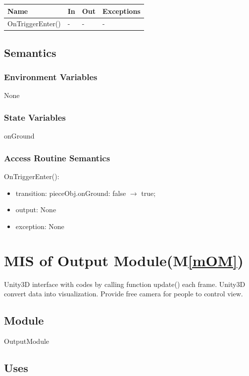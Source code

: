 \documentclass[12pt, titlepage]{article}
\newcommand{\mref}[1]{M\ref{#1}}
\begin{document}
\begin{center}
	\begin{tabular}{p{4cm} p{4cm} p{4cm} p{2cm}}
		\hline
		\textbf{Name} & \textbf{In} & \textbf{Out} & \textbf{Exceptions} \\
		\hline
		OnTriggerEnter() & - & - & - \\
		\hline
	\end{tabular}
\end{center}

\subsection{Semantics}

\subsubsection{Environment Variables}
None
\subsubsection{State Variables}

onGround

\subsubsection{Access Routine Semantics}

\noindent OnTriggerEnter():
\begin{itemize}
	\item transition: pieceObj.onGround: false $\to$ true;
	\item output: None 
	\item exception: None 
\end{itemize}

\section{MIS of Output Module(\mref{mOM})}

Unity3D interface with codes by calling function update() each frame. Unity3D convert data into visualization. Provide free camera for people to control view.

\subsection{Module}

OutputModule

\subsection{Uses}
\end{document}

